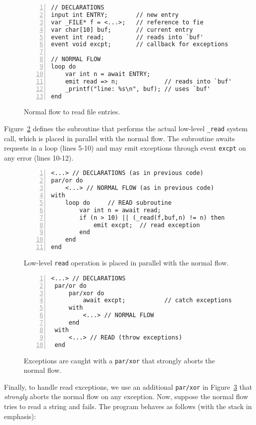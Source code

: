 \documentclass{acm_proc_article-sp}
\newcommand{\code}[1] {{\small{\texttt{#1}}}}
\newcommand{\1}{\;}
\newcommand{\2}{\;\;}
\newcommand{\3}{\;\;\;}
\newcommand{\5}{\;\;\;\;\;}
\begin{document}
\begin{figure}[t]
\begin{lstlisting}[numbers=left,xleftmargin=2em]
// DECLARATIONS
input int ENTRY;        // new entry
var _FILE* f = <...>;   // reference to fie
var char[10] buf;       // current entry
event int read;         // reads into `buf'
event void excpt;       // callback for exceptions

// NORMAL FLOW
loop do
    var int n = await ENTRY;
    emit read => n;             // reads into `buf'
    _printf("line: %s\n", buf); // uses `buf'
end
\end{lstlisting}
\caption{ Normal flow to read file entries.
\label{lst.excpt1}
}
\end{figure}

Figure~\ref{lst.excpt2} defines the subroutine that performs the actual 
low-level \code{\_read} system call, which is placed in parallel with the 
normal flow.
The subroutine awaits requests in a loop (lines 5-10) and may emit
exceptions through event \code{excpt} on any error (lines 10-12).

\begin{figure}[t]
\begin{lstlisting}[numbers=left,xleftmargin=2em]
<...> // DECLARATIONS (as in previous code)
par/or do
    <...> // NORMAL FLOW (as in previous code)
with
    loop do     // READ subroutine
        var int n = await read;
        if (n > 10) || (_read(f,buf,n) != n) then
            emit excpt;  // read exception
        end
    end
end
\end{lstlisting}
\caption{ Low-level \code{read} operation is placed in parallel with the normal 
flow.
\label{lst.excpt2}
}
\end{figure}

\begin{figure}[t]
\begin{lstlisting}[numbers=left,xleftmargin=2em]
 <...> // DECLARATIONS
 par/or do
     par/xor do
         await excpt;           // catch exceptions
     with
         <...> // NORMAL FLOW
     end
 with
     <...> // READ (throw exceptions)
 end
\end{lstlisting}
\caption{ Exceptions are caught with a \code{par/xor} that strongly aborts the 
normal flow.
\label{lst.excpt3}
}
\end{figure}

Finally, to handle read exceptions, we use an additional \code{par/xor} in 
Figure~\ref{lst.excpt3} that \emph{strongly} aborts the normal flow on any 
exception.
Now, suppose the normal flow tries to read a string and fails.
The program behaves as follows (with the stack in emphasis):
\end{document}
